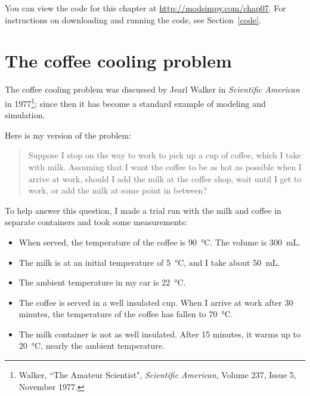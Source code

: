 \documentclass[12pt]{book}
\theoremstyle{exercise}
\begin{document}
You can view the code for this chapter at \url{http://modsimpy.com/chap07}.  For instructions on downloading and running the code, see Section~\ref{code}.

\section{The coffee cooling problem}

The coffee cooling problem was discussed by Jearl Walker in {\it Scientific American} in 1977\footnote{Walker, ``The Amateur Scientist", {\it Scientific American}, Volume 237, Issue 5, November 1977.}; since then it has become a standard example of modeling and simulation.

Here is my version of the problem:

\begin{quote}
Suppose I stop on the way to work to pick up a cup of coffee, which I take with milk.  Assuming that I want the coffee to be as hot as possible when I arrive at work, should I add the milk at the coffee shop, wait until I get to work, or add the milk at some point in between?
\end{quote}

To help answer this question, I made a trial run with the milk and coffee in separate containers and took some measurements:

\begin{itemize}

\item When served, the temperature of the coffee is \SI{90}{\celsius}.  The volume is \SI{300}{mL}.

\item The milk is at an initial temperature of \SI{5}{\celsius}, and I take about \SI{50}{mL}.

\item The ambient temperature in my car is \SI{22}{\celsius}.

\item The coffee is served in a well insulated cup.  When I arrive at work after 30 minutes, the temperature of the coffee has fallen to \SI{70}{\celsius}.

\item The milk container is not as well insulated.  After 15 minutes, it warms up to \SI{20}{\celsius}, nearly the ambient temperature.

\end{itemize}
\end{document}
